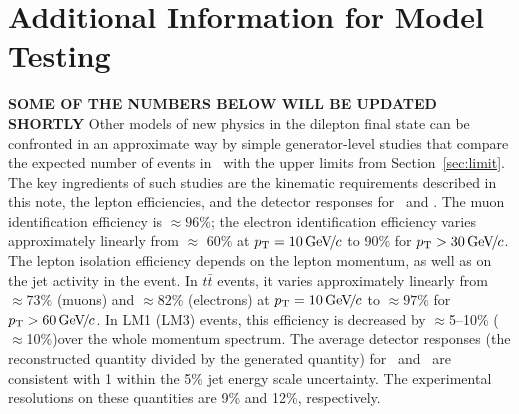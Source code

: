 \section{Additional Information for Model Testing}
\label{sec:outreach}
{\bf SOME OF THE NUMBERS BELOW WILL BE UPDATED SHORTLY}
Other models of new physics in the dilepton final state can be confronted in an approximate way by simple 
generator-level studies that compare the expected number of events in \lumifinal\
with the upper limits from Section~\ref{sec:limit}.
The key ingredients of such studies are the kinematic requirements described 
in this note, the lepton efficiencies, and the detector responses for \HT\ and \MET.
%
The muon identification efficiency is $\approx 96\%$;
the electron identification efficiency varies approximately linearly from $\approx$ 60\% at 
$p_{\mathrm{T}} = 10{\,\text{Ge\hspace{-.08em}V\hspace{-0.16em}/\hspace{-0.08em}}c}$ to 90\% for $p_{\mathrm{T}} > 30{\,\text{Ge\hspace{-.08em}V\hspace{-0.16em}/\hspace{-0.08em}}c}$.  
%
The lepton isolation efficiency depends on the lepton momentum, as well as on the jet activity in the 
event.
In $t\bar{t}$ events, it varies approximately linearly from $\approx 73\%$ (muons)
and $\approx 82\%$ (electrons) at $p_{\mathrm{T}}=10{\,\text{Ge\hspace{-.08em}V\hspace{-0.16em}/\hspace{-0.08em}}c}$ to $\approx 97\%$ for $p_{\mathrm{T}}>60{\,\text{Ge\hspace{-.08em}V\hspace{-0.16em}/\hspace{-0.08em}}c}$. 
In LM1 (LM3) events, this efficiency is decreased by $\approx$5--10\% ($\approx$10\%)over the whole momentum spectrum.
%
The average detector responses (the reconstructed quantity divided by the generated quantity) 
for \HT\ and \MET\ are consistent with 1 within the 5\% jet energy scale uncertainty.
The experimental resolutions on these quantities are 9\% and 12\%, respectively.



